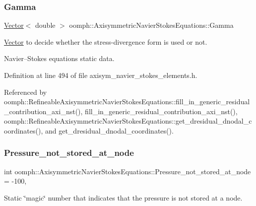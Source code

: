 \subsubsection{\texorpdfstring{Gamma}{Gamma}}
{\footnotesize\ttfamily \hyperlink{classoomph_1_1Vector}{Vector}$<$ double $>$ oomph\+::\+Axisymmetric\+Navier\+Stokes\+Equations\+::\+Gamma\hspace{0.3cm}{\ttfamily [static]}}



\hyperlink{classoomph_1_1Vector}{Vector} to decide whether the stress-\/divergence form is used or not. 

Navier--Stokes equations static data. 

Definition at line 494 of file axisym\+\_\+navier\+\_\+stokes\+\_\+elements.\+h.



Referenced by oomph\+::\+Refineable\+Axisymmetric\+Navier\+Stokes\+Equations\+::fill\+\_\+in\+\_\+generic\+\_\+residual\+\_\+contribution\+\_\+axi\+\_\+nst(), fill\+\_\+in\+\_\+generic\+\_\+residual\+\_\+contribution\+\_\+axi\+\_\+nst(), oomph\+::\+Refineable\+Axisymmetric\+Navier\+Stokes\+Equations\+::get\+\_\+dresidual\+\_\+dnodal\+\_\+coordinates(), and get\+\_\+dresidual\+\_\+dnodal\+\_\+coordinates().

\mbox{\label{classoomph_1_1AxisymmetricNavierStokesEquations_a7de6189781f4b7f59de7ae96f669a93b}} 
\subsubsection{\texorpdfstring{Pressure\+\_\+not\+\_\+stored\+\_\+at\+\_\+node}{Pressure\_not\_stored\_at\_node}}
{\footnotesize\ttfamily int oomph\+::\+Axisymmetric\+Navier\+Stokes\+Equations\+::\+Pressure\+\_\+not\+\_\+stored\+\_\+at\+\_\+node = -\/100\hspace{0.3cm}{\ttfamily [static]}, {\ttfamily [private]}}



Static \char`\"{}magic\char`\"{} number that indicates that the pressure is not stored at a node. 

